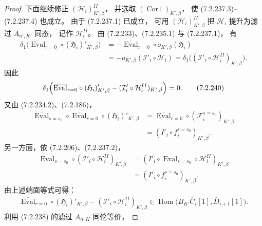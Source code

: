 \begin{proof}
下面继续修正 $(\mathcal H_i)^{II}_{K',\beta}$，
并选取 $(\operatorname{Cor1})_{K',\beta}$，
使 (7.2.237.3)--(7.2.237.4) 也成立。
由于 (7.2.237.1) 已成立，
可用 $(\mathcal H_i)^{II}_{K',\beta}$
把 $\mathcal H_i$ 提升为滤过 $A_{n',K'}$ 同态，
记作 $\mathcal H_i^{II}$。
由 (7.2.233)、(7.2.235.1) 与 (7.2.237.1)，
有
\[
\begin{aligned}
\delta_1\bigl(
\overline{\operatorname{Eval}}_{r=0}\circ
(\mathfrak H_i)'_{K',\beta}\bigr)
&=-\overline{\operatorname{Eval}}_{r=0}\circ
o_{K',\beta}(\mathfrak H_i)\\
&=-o_{K',\beta}(\mathcal I'_i\circ\mathcal H_i)
=\delta_1\bigl(
(\mathcal I'_i\circ\mathcal H_i^{II})_{K',\beta}
\bigr).
\end{aligned}
\]
因此
\begin{equation}
\delta_1\Bigl(
\overline{\operatorname{Eval}}_{r=0}\circ
(\mathfrak H_i)'_{K',\beta}
-(\mathcal I'_i\circ\mathcal H_i^{II})_{K',\beta}
\Bigr)=0.
\tag{7.2.240}\label{eq:7-2-240}
\end{equation}
又由 (7.2.234.2)、(7.2.186)，
\[
\begin{aligned}
\overline{\operatorname{Eval}}_{s=s_0}\circ
\overline{\operatorname{Eval}}_{r=0}\circ
(\mathfrak H_i)'_{K',\beta}
&=\overline{\operatorname{Eval}}_{r=0}\circ
(\mathcal F_i^{s=s_0})_{K',\beta}\\
&=(I'_i\circ f_i^{s=s_0})_{K',\beta}.
\end{aligned}
\]
另一方面，依 (7.2.206)、(7.2.237.2)，
\[
\begin{aligned}
\overline{\operatorname{Eval}}_{s=s_0}\circ
(\mathcal I'_i\circ\mathcal H_i^{II})_{K',\beta}
&=(I'_i\circ
\overline{\operatorname{Eval}}_{s=s_0}\circ
\mathcal H_i^{II})_{K',\beta}\\
&=(I'_i\circ f_i^{s=s_0})_{K',\beta}.
\end{aligned}
\]
由上述端面等式可得：
\begin{equation}
\begin{aligned}
\overline{\operatorname{Eval}}_{r=0}\circ
(\mathfrak H_i)'_{K',\beta}
-(\mathcal I'_i\circ\mathcal H_i^{II})_{K',\beta}
\in\operatorname{Hom}\bigl(
B_{K'}\overline C_i[1],\overline D_{i+1}[1]
\bigr).
\end{aligned}
\tag{7.2.241}\label{eq:7-2-241}
\end{equation}
利用 (7.2.238) 的滤过 $A_{n,K}$ 同伦等价，

\end{proof}
